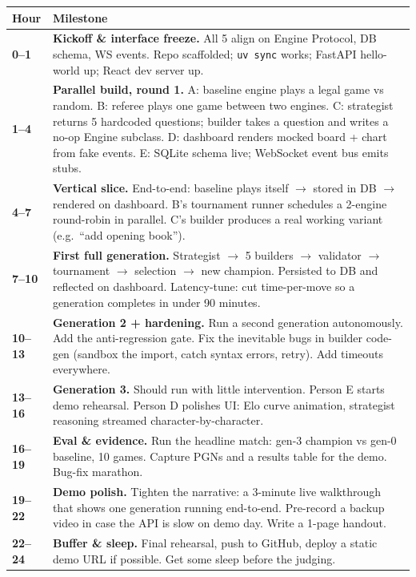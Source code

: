 \documentclass[11pt]{article}
\begin{document}
\begin{center}
\renewcommand{\arraystretch}{1.2}
\begin{longtable}{@{}p{}p{}@{}}
\toprule
\textbf{Hour} & \textbf{Milestone} \\
\midrule
\endhead
\textbf{0--1} & \textbf{Kickoff \& interface freeze.} All 5 align on Engine Protocol, DB schema, WS events. Repo scaffolded; \texttt{uv sync} works; FastAPI hello-world up; React dev server up. \\
\textbf{1--4} & \textbf{Parallel build, round 1.} A: baseline engine plays a legal game vs random. B: referee plays one game between two engines. C: strategist returns 5 hardcoded questions; builder takes a question and writes a no-op Engine subclass. D: dashboard renders mocked board + chart from fake events. E: SQLite schema live; WebSocket event bus emits stubs. \\
\textbf{4--7} & \textbf{Vertical slice.} End-to-end: baseline plays itself $\rightarrow$ stored in DB $\rightarrow$ rendered on dashboard. B's tournament runner schedules a 2-engine round-robin in parallel. C's builder produces a real working variant (e.g.\ ``add opening book''). \\
\textbf{7--10} & \textbf{First full generation.} Strategist $\rightarrow$ 5 builders $\rightarrow$ validator $\rightarrow$ tournament $\rightarrow$ selection $\rightarrow$ new champion. Persisted to DB and reflected on dashboard. Latency-tune: cut time-per-move so a generation completes in under 90 minutes. \\
\textbf{10--13} & \textbf{Generation 2 + hardening.} Run a second generation autonomously. Add the anti-regression gate. Fix the inevitable bugs in builder code-gen (sandbox the import, catch syntax errors, retry). Add timeouts everywhere. \\
\textbf{13--16} & \textbf{Generation 3.} Should run with little intervention. Person E starts demo rehearsal. Person D polishes UI: Elo curve animation, strategist reasoning streamed character-by-character. \\
\textbf{16--19} & \textbf{Eval \& evidence.} Run the headline match: gen-3 champion vs gen-0 baseline, 10 games. Capture PGNs and a results table for the demo. Bug-fix marathon. \\
\textbf{19--22} & \textbf{Demo polish.} Tighten the narrative: a 3-minute live walkthrough that shows one generation running end-to-end. Pre-record a backup video in case the API is slow on demo day. Write a 1-page handout. \\
\textbf{22--24} & \textbf{Buffer \& sleep.} Final rehearsal, push to GitHub, deploy a static demo URL if possible. Get some sleep before the judging. \\
\bottomrule
\end{longtable}
\end{center}
\end{document}
